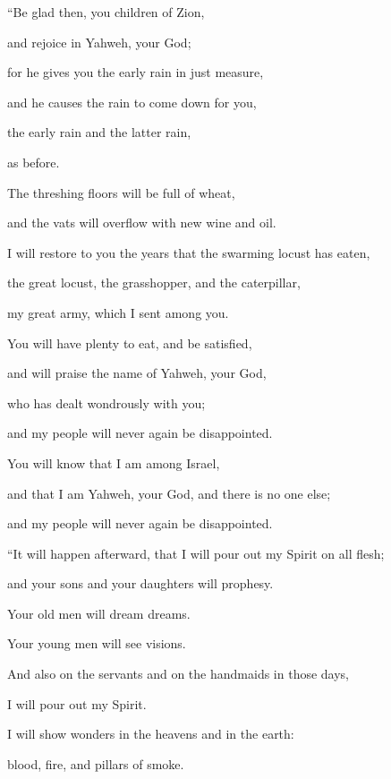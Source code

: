 {\par }{\BB \par }{\Q {}“Be glad then, you children of Zion,
\par }{\QB and rejoice in Yahweh, your God;
\par }{\QB for he gives you the early rain in just measure,
\par }{\QB and he causes the rain to come down for you,
\par }{\QB the early rain and the latter rain,
\par }{\QB as before.
\par }{\Q {}The threshing floors will be full of wheat,
\par }{\QB and the vats will overflow with new wine and oil.
\par }{\Q {}I will restore to you the years that the swarming locust has eaten,
\par }{\QB the great locust, the grasshopper, and the caterpillar,
\par }{\QB my great army, which I sent among you.
\par }{\Q {}You will have plenty to eat, and be satisfied,
\par }{\QB and will praise the name of Yahweh, your God,
\par }{\QB who has dealt wondrously with you;
\par }{\QB and my people will never again be disappointed.
\par }{\Q {}You will know that I am among Israel,
\par }{\QB and that I am Yahweh, your God, and there is no one else;
\par }{\QB and my people will never again be disappointed.
\par }{\BB \par }{\Q {}“It will happen afterward, that I will pour out my Spirit on all flesh;
\par }{\QB and your sons and your daughters will prophesy.
\par }{\QB Your old men will dream dreams.
\par }{\QB Your young men will see visions.
\par }{\Q {}And also on the servants and on the handmaids in those days,
\par }{\QB I will pour out my Spirit.
\par }{\Q {}I will show wonders in the heavens and in the earth:
\par }{\QB blood, fire, and pillars of smoke.
}
